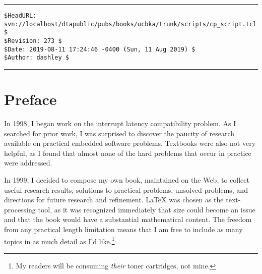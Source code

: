 \documentclass[letterpaper,10pt,titlepage]{custbook}
\begin{document}
\newcommand\curvoltitle{Full Edition (All Content)}
\newcommand\curvolroman{}
\newcommand\curvoltitlepagesep{}
\newcommand\curvoltitlepageprefix{}


%
\vspace{-0.45in}
%
\noindent\begin{minipage}{\textwidth}
\noindent\rule[-0.25in]{\textwidth}{1pt}
\begin{tiny}
\begin{verbatim}
$HeadURL: svn://localhost/dtapublic/pubs/books/ucbka/trunk/scripts/cp_script.tcl $
$Revision: 273 $
$Date: 2019-08-11 17:24:46 -0400 (Sun, 11 Aug 2019) $
$Author: dashley $
\end{verbatim}
\end{tiny}
\noindent\rule[0.25in]{\textwidth}{1pt}
\end{minipage}
%
\frontmatter{}
%
%
%
\chapter{Preface}

In 1998, I began work on the
interrupt latency compatibility problem.  As I searched
for prior work, I was
surprised to discover the paucity
of research available on practical embedded software
problems.  Textbooks were also not very helpful,
as I found that almost none
of the hard
problems that occur in practice
were addressed.

In 1999, I decided to compose my own book,
maintained on the Web,
to collect useful
research results, solutions to practical problems,
unsolved problems, and directions for future
research and refinement.
\LaTeX{} was chosen as the text-processing
tool, as it was 
recognized immediately
that size could become an issue and that the book
would have a substantial mathematical content.
The freedom from any practical length
limitation
means that I am
free to include as many topics
in as much detail as I'd like.\footnote{My readers will
be consuming \emph{their} toner cartridges, not mine.}
\end{document}
